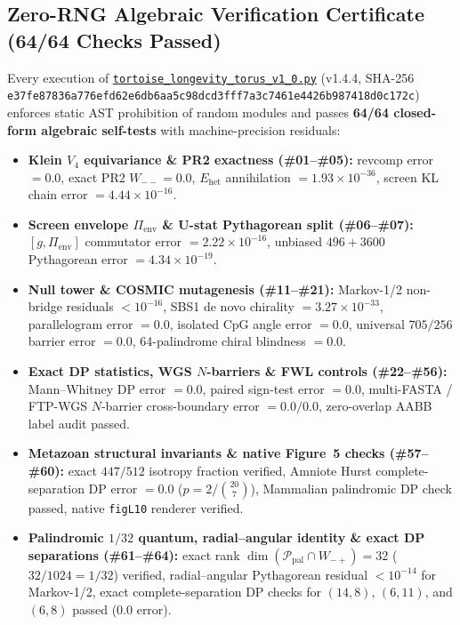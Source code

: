 \documentclass[11pt,a4paper]{article}
\renewcommand{\_}{\origunderscore\penalty200\relax}
\theoremstyle{remark}
\begin{document}
\subsection{Zero-RNG Algebraic Verification Certificate (64/64 Checks Passed)}
\label{app:selftest}
Every execution of \href{https://github.com/Dr-Logvinovich/longevity-codon-torus/blob/main/tortoise_longevity_torus_v1_0.py}{\nolinkurl{tortoise_longevity_torus_v1_0.py}} (v1.4.4, SHA-256 \texttt{e37fe878\allowbreak 36a776ef\allowbreak d62e6db6\allowbreak aa5c98dc\allowbreak d3fff7a3\allowbreak c7461e44\allowbreak 26b98741\allowbreak 8d0c172c}) enforces static AST prohibition of random modules and passes \textbf{64/64 closed-form algebraic self-tests} with machine-precision residuals:
\begin{itemize}
  \item \textbf{Klein $V_4$ equivariance \& PR2 exactness (\#01--\#05):} revcomp error $= 0.0$, exact PR2 $W_{--} = 0.0$, $E_{\mathrm{het}}$ annihilation $= 1.93 \times 10^{-36}$, screen KL chain error $= 4.44 \times 10^{-16}$.
  \item \textbf{Screen envelope $\Pi_{\mathrm{env}}$ \& U-stat Pythagorean split (\#06--\#07):} $[g, \Pi_{\mathrm{env}}]$ commutator error $= 2.22 \times 10^{-16}$, unbiased $496+3600$ Pythagorean error $= 4.34 \times 10^{-19}$.
  \item \textbf{Null tower \& COSMIC mutagenesis (\#11--\#21):} Markov-1/2 non-bridge residuals $< 10^{-16}$, SBS1 de novo chirality $= 3.27 \times 10^{-33}$, parallelogram error $= 0.0$, isolated CpG angle error $= 0.0$, universal $705/256$ barrier error $= 0.0$, 64-palindrome chiral blindness $= 0.0$.
  \item \textbf{Exact DP statistics, WGS $N$-barriers \& FWL controls (\#22--\#56):} Mann--Whitney DP error $= 0.0$, paired sign-test error $= 0.0$, multi-FASTA / FTP-WGS $N$-barrier cross-boundary error $= 0.0 / 0.0$, zero-overlap AABB label audit passed.
  \item \textbf{Metazoan structural invariants \& native Figure~5 checks (\#57--\#60):} exact $447/512$ isotropy fraction verified, Amniote Hurst complete-separation DP error $= 0.0$ ($p = 2/\binom{20}{7}$), Mammalian palindromic DP check passed, native \texttt{fig\_L10} renderer verified.
  \item \textbf{Palindromic $1/32$ quantum, radial--angular identity \& exact DP separations (\#61--\#64):} exact rank $\dim(\mathcal{P}_{\mathrm{pal}}\cap W_{-+}) = 32$ ($32/1024 = 1/32$) verified, radial--angular Pythagorean residual $< 10^{-14}$ for Markov-1/2, exact complete-separation DP checks for $(14,8)$, $(6,11)$, and $(6,8)$ passed ($0.0$ error).
\end{itemize}
\end{document}
